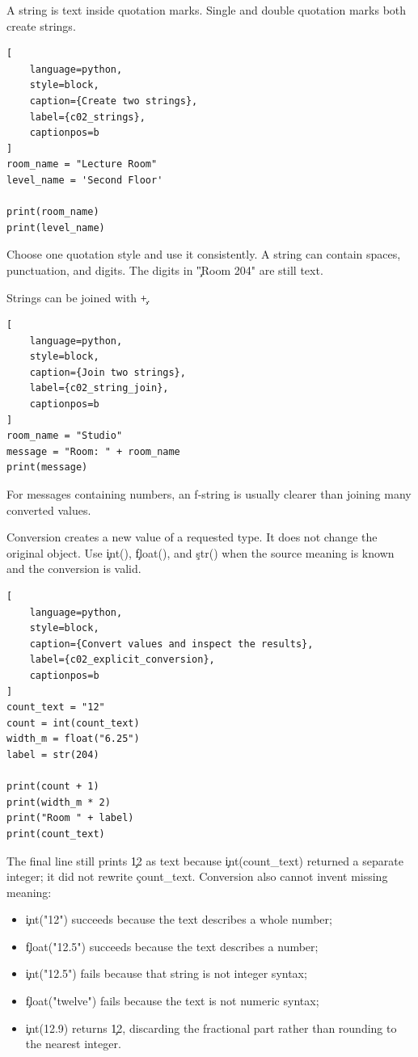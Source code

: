 A string is text inside quotation marks. Single and double quotation marks
both create strings.

\begin{lstlisting}[
    language=python,
    style=block,
    caption={Create two strings},
    label={c02_strings},
    captionpos=b
]
room_name = "Lecture Room"
level_name = 'Second Floor'

print(room_name)
print(level_name)
\end{lstlisting}

Choose one quotation style and use it consistently. A string can contain
spaces, punctuation, and digits. The digits in \c{"Room 204"} are still text.

Strings can be joined with \c{+}.

\begin{lstlisting}[
    language=python,
    style=block,
    caption={Join two strings},
    label={c02_string_join},
    captionpos=b
]
room_name = "Studio"
message = "Room: " + room_name
print(message)
\end{lstlisting}

For messages containing numbers, an f-string is usually clearer than joining
many converted values.


Conversion creates a new value of a requested type. It does not change the
original object. Use \c{int()}, \c{float()}, and \c{str()} when the source
meaning is known and the conversion is valid.

\begin{lstlisting}[
    language=python,
    style=block,
    caption={Convert values and inspect the results},
    label={c02_explicit_conversion},
    captionpos=b
]
count_text = "12"
count = int(count_text)
width_m = float("6.25")
label = str(204)

print(count + 1)
print(width_m * 2)
print("Room " + label)
print(count_text)
\end{lstlisting}

The final line still prints \c{12} as text because \c{int(count_text)} returned
a separate integer; it did not rewrite \c{count_text}. Conversion also cannot
invent missing meaning:
\begin{itemize}
    \item \c{int("12")} succeeds because the text describes a whole number;
    \item \c{float("12.5")} succeeds because the text describes a number;
    \item \c{int("12.5")} fails because that string is not integer syntax;
    \item \c{float("twelve")} fails because the text is not numeric syntax;
    \item \c{int(12.9)} returns \c{12}, discarding the fractional part rather
          than rounding to the nearest integer.
\end{itemize}


